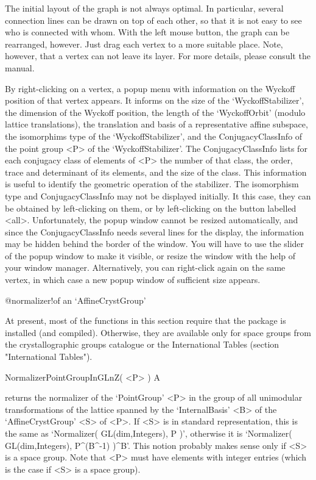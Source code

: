 The initial layout of the graph is not always optimal. In particular,
several connection lines can be drawn on top of each other, so that
it is not easy to see who is connected with whom. With the left
mouse button, the graph can be rearranged, however. Just drag each 
vertex to a more suitable place. Note, however, that a vertex can not 
leave its layer. For more details, please consult the {\XGAP} manual.

By right-clicking on a vertex, a popup menu with information on the
Wyckoff position of that vertex appears. It informs on the size of
the `WyckoffStabilizer', the dimension of the Wyckoff position, 
the length of the `WyckoffOrbit' (modulo lattice translations),
the translation and basis of a representative affine subspace, the
isomorphims type of the `WyckoffStabilizer', and the ConjugacyClassInfo
of the point group <P> of the `WyckoffStabilizer'. The ConjugacyClassInfo
lists for each conjugacy class of elements of <P> the number of that 
class, the order, trace and determinant of its elements, and the 
size of the class. This information is useful to identify the 
geometric operation of the stabilizer. The isomorphism type and
ConjugacyClassInfo may not be displayed initially. It this case,
they can be obtained by left-clicking on them, or by left-clicking
on the button labelled <all>. Unfortunately, the popup window 
cannot be resized automatically, and since the ConjugacyClassInfo 
needs several lines for the display, the information may be hidden 
behind the border of the window. You will have to use the slider of
the popup window to make it visible, or resize the window with the
help of your window manager. Alternatively, you can right-click 
again on the same vertex, in which case a new popup window of 
sufficient size appears. 



%
{@normalizer!of an \noexpand`AffineCrystGroup'}

At present, most of the functions in this section require that the 
{\GAP} package {\CARAT} is installed (and compiled). Otherwise, they 
are available only for space groups from the crystallographic 
groups catalogue or the International Tables (section "International
Tables").

\>NormalizerPointGroupInGLnZ( <P> ) A

returns the normalizer of the `PointGroup' <P> in the group of 
all unimodular transformations of the lattice spanned by the
`InternalBasis' <B> of the `AffineCrystGroup' <S> of <P>. 
If <S> is in standard representation, this is the same as 
`Normalizer( GL(dim,Integers), P )', otherwise it is
`Normalizer( GL(dim,Integers), P^(B^-1) )^B'. This notion
probably makes sense only if <S> is a space group. Note that 
<P> must have elements with integer entries (which is the case 
if <S> is a space group).

